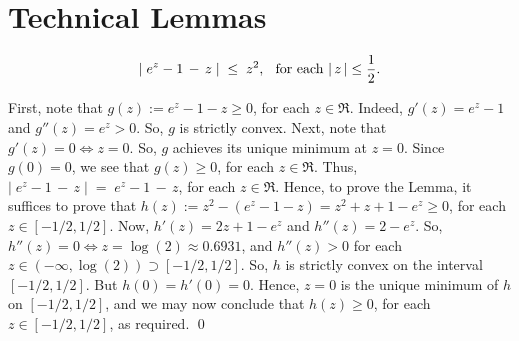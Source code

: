 

\section{Technical Lemmas}
\setcounter{theorem}{0}
\setcounter{equation}{0}

\renewcommand{\theenumi}{\alph{enumi}}
\renewcommand{\labelenumi}{\textnormal{(\theenumi)}$\;\;$}

\begin{lemma}
\label{BoundEOneZ}
\begin{equation*}
\left\vert\; e^{z} - 1 \, - \, z \;\right\vert \; \leq \; z^{2},
\;\;\,
\textnormal{for each $\vert\,z\,\vert \leq \dfrac{1}{2}$}. 
\end{equation*}
\end{lemma}
\proof
First, note that $g(z) := e^{z} - 1 - z\geq 0$, for each $z \in \Re$.
Indeed, $g'(z) = e^{z} - 1$ and $g''(z) = e^{z} > 0$.
So, $g$ is strictly convex.
Next, note that $g'(z) = 0 \Longleftrightarrow z = 0$.
So, $g$ achieves its unique minimum at $z = 0$.
Since $g(0) = 0$, we see that $g(z) \geq 0$,
for each $z \in \Re$.
Thus, $\left\vert\; e^{z} - 1 \, - \, z \;\right\vert \;=\; e^{z} - 1 \, - \, z$, for each $z \in \Re$.
Hence, to prove the Lemma, it suffices to prove that
$h(z) := z^{2} - (e^{z} - 1 - z) = z^{2} + z + 1 - e^{z} \geq 0$,
for each $z \in [-1/2,1/2]$.
Now, $h'(z) = 2z + 1 - e^{z}$ and $h''(z) = 2 - e^{z}$.
So, $h''(z) = 0 \Longleftrightarrow z = \log(2) \approx 0.6931$, and $h''(z) > 0$ for each $z \in (-\infty,\log(2)) \supset [-1/2,1/2]$.
So, $h$ is strictly convex on the interval $[-1/2,1/2]$. But $h(0) = h'(0) = 0$.
Hence, $z = 0$ is the unique minimum of $h$ on $[-1/2,1/2]$, and we may now conclude that $h(z) \geq 0$,
for each $z \in [-1/2,1/2]$, as required.
\qed

